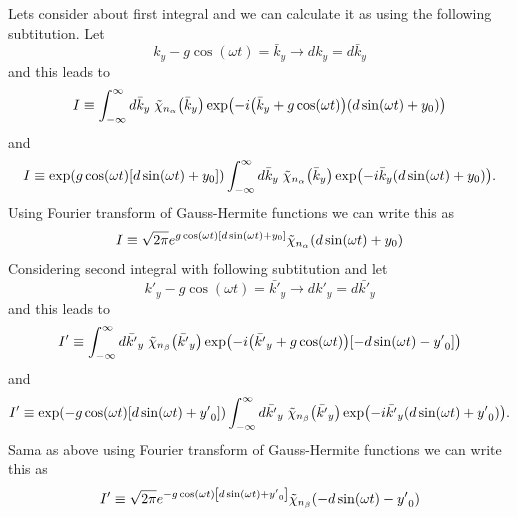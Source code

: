 \noindent
Lets consider about first integral and we can calculate it as using the following subtitution. Let
\begin{equation} \label{4.30}
  {k}_y -g\cos(\omega t) = \bar{k}_y \longrightarrow d{k}_y = d\bar{k}_y
\end{equation}
and this leads to
\begin{equation} \label{4.31}
    I \equiv
    \int_{-\infty}^{\infty} d\bar{k}_y \;
    \tilde{\chi}_{n_{\alpha}}\qty(\bar{k}_y)
    \exp(
      -i\qty(\bar{k}_y + g\cos(\omega t)) \qty(d\sin(\omega t) + y_0)
    )
\end{equation}
and
\begin{equation} \label{4.32}
    I \equiv
    \exp(g\cos(\omega t)\qty[d\sin(\omega t) + y_0])
    \int_{-\infty}^{\infty} d\bar{k}_y \;
    \tilde{\chi}_{n_{\alpha}}\qty(\bar{k}_y)
    \exp(
      -i\bar{k}_y\qty(d\sin(\omega t) + y_0)
    ).
\end{equation}
Using Fourier transform of Gauss-Hermite functions we can write this as
\begin{equation} \label{4.33}
    I \equiv
    \sqrt{2\pi}
    e^{g\cos(\omega t)\qty[d\sin(\omega t) + y_0]}
    \tilde{\chi}_{n_{\alpha}}\qty(d\sin(\omega t) + y_0)
\end{equation}
Considering second integral with following subtitution and let
\begin{equation} \label{4.34}
  {k'}_y - g\cos(\omega t) = \bar{k'}_y \longrightarrow d{k'}_y = d\bar{k'}_y
\end{equation}
and this leads to
\begin{equation} \label{4.35}
    I' \equiv
    \int_{-\infty}^{\infty} d\bar{k'}_y \;
    \tilde{\chi}_{n_{\beta}}\qty(\bar{k'}_y)
    \exp(
      -i\qty(\bar{k'}_y + g\cos(\omega t)) \qty[-d\sin(\omega t) - {y'}_0]
    )
\end{equation}
and
\begin{equation} \label{4.36}
    I' \equiv
    \exp(-g\cos(\omega t)\qty[d\sin(\omega t) + {y'}_0])
    \int_{-\infty}^{\infty} d\bar{k'}_y \;
    \tilde{\chi}_{n_{\beta}}\qty(\bar{k'}_y)
    \exp(
      -i\bar{k'}_y\qty(d\sin(\omega t) + {y'}_0)
    ).
\end{equation}
Sama as above using Fourier transform of Gauss-Hermite functions we can write this as
\begin{equation} \label{4.37}
    I' \equiv
    \sqrt{2\pi}
    e^{-g\cos(\omega t)\qty[d\sin(\omega t) + {y'}_0]}
    \tilde{\chi}_{n_{\beta}}\qty(-d\sin(\omega t) - {y'}_0)
\end{equation}

